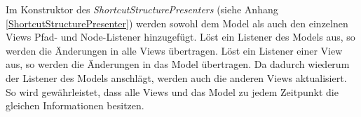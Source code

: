 Im Konstruktor des \emph{ShortcutStructurePresenters} (siehe Anhang \ref{ShortcutStructurePresenter}) werden sowohl dem Model als auch den einzelnen Views Pfad- und Node-Listener hinzugefügt. Löst ein Listener des Models aus, so werden die Änderungen in alle Views übertragen. Löst ein Listener einer View aus, so werden die Änderungen in das Model übertragen. Da dadurch wiederum der Listener des Models anschlägt, werden auch die anderen Views aktualisiert. So wird gewährleistet, dass alle Views und das Model zu jedem Zeitpunkt die gleichen Informationen besitzen.

\newpage